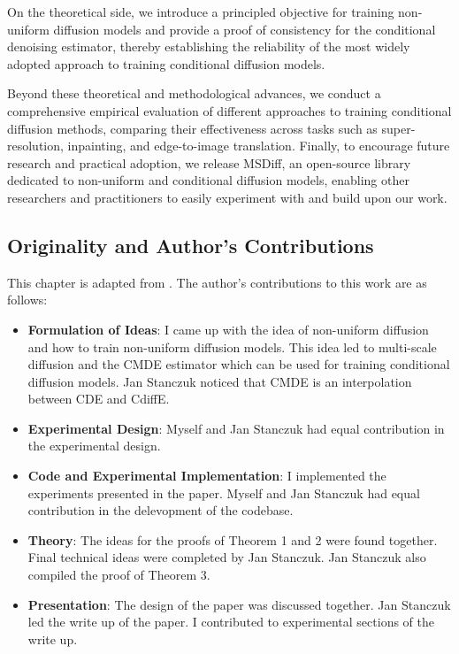 On the theoretical side, we introduce a principled objective for training non-uniform diffusion models and provide a proof of consistency for the conditional denoising estimator, thereby establishing the reliability of the most widely adopted approach to training conditional diffusion models.

Beyond these theoretical and methodological advances, we conduct a comprehensive empirical evaluation of different approaches to training conditional diffusion methods, comparing their effectiveness across tasks such as super-resolution, inpainting, and edge-to-image translation. Finally, to encourage future research and practical adoption, we release MSDiff, an open-source library dedicated to non-uniform and conditional diffusion models, enabling other researchers and practitioners to easily experiment with and build upon our work.

\subsection*{Originality and Author’s Contributions}

This chapter is adapted from \cite{batzolis2022non_uniform}.  The author’s contributions to this work are as follows:

\begin{itemize}
\item \textbf{Formulation of Ideas}: I came up with the idea of non-uniform diffusion and how to train non-uniform diffusion models. This idea led to multi-scale diffusion and the CMDE estimator which can be used for training conditional diffusion models. Jan Stanczuk noticed that CMDE is an interpolation between CDE and CdiffE.
\item \textbf{Experimental Design}: Myself and Jan Stanczuk had equal contribution in the experimental design.
\item \textbf{Code and Experimental Implementation}: I implemented the experiments presented in the paper. Myself and Jan Stanczuk had equal contribution in the delevopment of the codebase.
\item \textbf{Theory}: The ideas for the proofs of Theorem 1 and 2 were found together. Final technical ideas were completed by Jan Stanczuk. Jan Stanczuk also compiled the proof of Theorem 3.
\item \textbf{Presentation}: The design of the paper was discussed together. Jan Stanczuk led the write up of the paper. I contributed to experimental sections of the write up.
\end{itemize}

